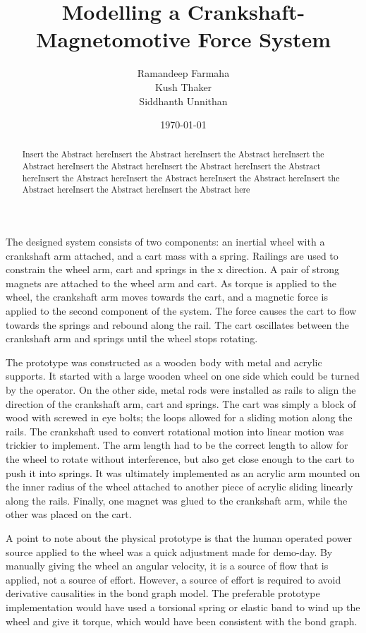 \documentclass[notitlepage,10pt]{report}
\title{Modelling a Crankshaft-Magnetomotive Force System}
\author{Ramandeep Farmaha \\ Kush Thaker \\ Siddhanth Unnithan}
\date{\today}
\begin{document}
\maketitle
\thispagestyle{empty}

\begin{abstract}
Insert the Abstract hereInsert the Abstract hereInsert the Abstract hereInsert the Abstract hereInsert the Abstract hereInsert the Abstract hereInsert the Abstract hereInsert the Abstract hereInsert the Abstract hereInsert the Abstract hereInsert the Abstract hereInsert the Abstract hereInsert the Abstract here
\end{abstract}
\begin{multicols}{2}
The designed system consists of two components: an inertial wheel with a crankshaft arm attached, and a cart mass with a spring. Railings are used to constrain the wheel arm, cart and springs in the x direction. A pair of strong magnets are attached to the wheel arm and cart. As torque is applied to the wheel, the crankshaft arm moves towards the cart, and a magnetic force is applied to the second component of the system. The force causes the cart to flow towards the springs and rebound along the rail. The cart oscillates between the crankshaft arm and springs until the wheel stops rotating.

The prototype was constructed as a wooden body with metal and acrylic supports. It started with a large wooden wheel on one side which could be turned by the operator. On the other side, metal rods were installed as rails to align the direction of the crankshaft arm, cart and springs. The cart was simply a block of wood with screwed in eye bolts; the loops allowed for a sliding motion along the rails. The crankshaft used to convert rotational motion into linear motion was trickier to implement. The arm length had to be the correct length to allow for the wheel to rotate without interference, but also get close enough to the cart to push it into springs. It was ultimately implemented as an acrylic arm mounted on the inner radius of the wheel attached to another piece of acrylic sliding linearly along the rails. Finally, one magnet was glued to the crankshaft arm, while the other was placed on the cart.

A point to note about the physical prototype is that the human operated power source applied to the wheel was a quick adjustment made for demo-day. By manually giving the wheel an angular velocity, it is a source of flow that is applied, not a source of effort. However, a source of effort is required to avoid derivative causalities in the bond graph model. The preferable prototype implementation would have used a torsional spring or elastic band to wind up the wheel and give it torque, which would have been consistent with the bond graph.


\end{multicols}
\end{document}
